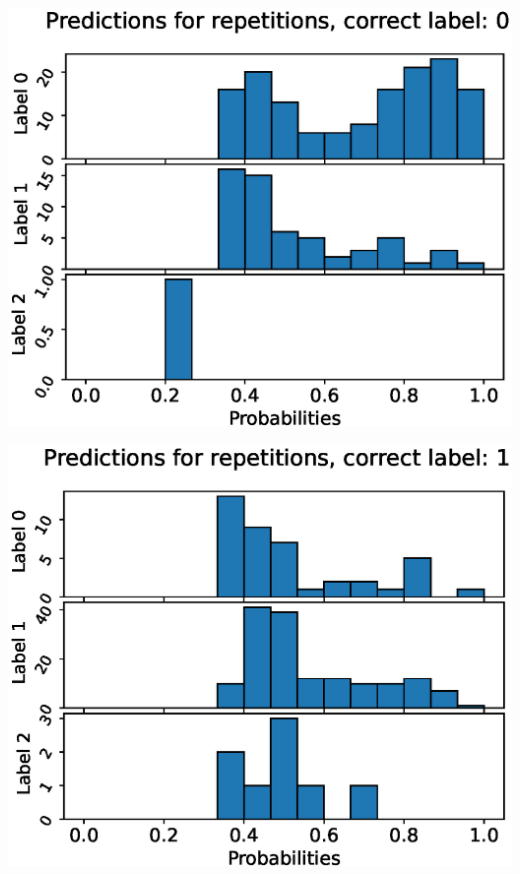 \begin{center}
\begin{minipage}{0.33\textwidth}
  \includegraphics[width=\textwidth]{files/figs/app/hists/femval/pr0.eps}
\end{minipage}%
\begin{minipage}{0.33\textwidth}
  \includegraphics[width=\textwidth]{files/figs/app/hists/femval/pr1.eps}
\end{minipage}%
\begin{minipage}{0.33\textwidth}

\end{minipage}
\end{center}
